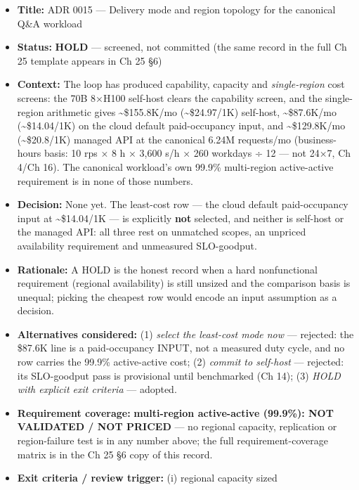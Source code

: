 \begin{itemize}
\tightlist
\item
  \textbf{Title:} ADR 0015 --- Delivery mode and region topology for the
  canonical Q\&A workload
\item
  \textbf{Status:} \textbf{HOLD} --- screened, not committed (the same
  record in the full Ch 25 template appears in Ch 25 §6)
\item
  \textbf{Context:} The loop has produced capability, capacity and
  \emph{single-region} cost screens: the 70B 8×H100 self-host clears the
  capability screen, and the single-region arithmetic gives
  \textasciitilde\$155.8K/mo (\textasciitilde\$24.97/1K) self-host,
  \textasciitilde\$87.6K/mo (\textasciitilde\$14.04/1K) on the cloud
  default paid-occupancy input, and \textasciitilde\$129.8K/mo
  (\textasciitilde\$20.8/1K) managed API at the canonical 6.24M
  requests/mo (business-hours basis: 10 rps × 8 h × 3,600 s/h × 260
  workdays ÷ 12 --- not 24×7, Ch 4/Ch 16). The canonical workload's own
  99.9\% multi-region active-active requirement is in none of those
  numbers.
\item
  \textbf{Decision:} None yet. The least-cost row --- the cloud default
  paid-occupancy input at \textasciitilde\$14.04/1K --- is explicitly
  \textbf{not} selected, and neither is self-host or the managed API:
  all three rest on unmatched scopes, an unpriced availability
  requirement and unmeasured SLO-goodput.
\item
  \textbf{Rationale:} A HOLD is the honest record when a hard
  nonfunctional requirement (regional availability) is still unsized and
  the comparison basis is unequal; picking the cheapest row would encode
  an input assumption as a decision.
\item
  \textbf{Alternatives considered:} (1) \emph{select the least-cost mode
  now} --- rejected: the \$87.6K line is a paid-occupancy INPUT, not a
  measured duty cycle, and no row carries the 99.9\% active-active cost;
  (2) \emph{commit to self-host} --- rejected: its SLO-goodput pass is
  provisional until benchmarked (Ch 14); (3) \emph{HOLD with explicit
  exit criteria} --- adopted.
\item
  \textbf{Requirement coverage:} \textbf{multi-region active-active
  (99.9\%): NOT VALIDATED / NOT PRICED} --- no regional capacity,
  replication or region-failure test is in any number above; the full
  requirement-coverage matrix is in the Ch 25 §6 copy of this record.
\item
  \textbf{Exit criteria / review trigger:} (i) regional capacity sized

\end{itemize}
